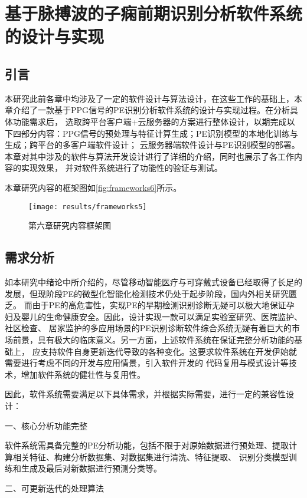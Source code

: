 \chapter{基于脉搏波的子痫前期识别分析软件系统的设计与实现}
\section{引言}
本研究此前各章中均涉及了一定的软件设计与算法设计，在这些工作的基础上，本章介绍了一款基于PPG信号的PE识别分析软件系统的设计与实现过程。在分析具体功能需求后，
选取跨平台客户端+云服务器的方案进行整体设计，以期完成以下四部分内容：PPG信号的预处理与特征计算生成；PE识别模型的本地化训练与生成；跨平台的多客户端软件设计；
云服务器端软件设计与PE识别模型的部署。本章对其中涉及的软件与算法开发设计进行了详细的介绍，同时也展示了各工作内容的实现效果，
并对软件系统进行了功能性的验证与测试。

本章研究内容的框架图如\autoref{fig:frameworks6}所示。

\begin{figure}[htbp]
    \centering
    \texttt{[image: results/frameworks5]}
    \caption{\label{fig:frameworks6}第六章研究内容框架图}
\end{figure}

\section{需求分析}
如本研究中绪论中所介绍的，尽管移动智能医疗与可穿戴式设备已经取得了长足的发展，但现阶段PE的微型化智能化检测技术仍处于起步阶段，国内外相关研究匮乏。
而由于PE的高危害性，实现PE的早期检测识别诊断无疑可以极大地保证孕妇及婴儿的生命健康安全。因此，设计实现一款可以满足实验室研究、医院监护、社区检查、
居家监护的多应用场景的PE识别诊断软件综合系统无疑有着巨大的市场前景，具有极大的临床意义。另一方面，上述软件系统在保证完整分析功能的基础上，
应支持软件自身更新迭代导致的各种变化。这要求软件系统在开发伊始就需要进行考虑不同的开发与应用情景，引入软件开发的
代码复用与模式设计等技术，增加软件系统的健壮性与复用性\cite{Enrich2018}。

因此，软件系统需要满足以下具体需求，并根据实际需要，进行一定的兼容性设计：

一、核心分析功能完整

软件系统需具备完整的PE分析功能，包括不限于对原始数据进行预处理、提取计算相关特征、构建分析数据集、对数据集进行清洗、特征提取、
识别分类模型训练和生成及最后对新数据进行预测分类等。

二、可更新迭代的处理算法

